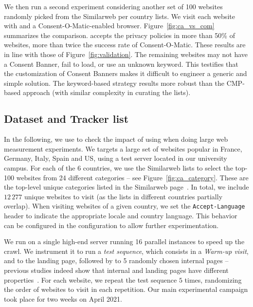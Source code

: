 We then run a second experiment considering another set of 100 websites randomly picked from the Similarweb per country lists. We visit each website with \TOOL and a Consent-O-Matic-enabled browser. Figure~\ref{fig:ca_vs_com} summarizes the comparison. \TOOL accepts the privacy policies in more than 50\% of websites, more than twice the success rate of Consent-O-Matic. These results are in line with those of Figure~\ref{fig:validation}. The remaining websites may not have a Consent Banner, fail to load, or use an unknown keyword. This testifies that the customization of Consent Banners makes it difficult to engineer a generic and simple solution. The keyword-based strategy results more robust than the CMP-based approach (with similar complexity in curating the lists).



\subsection{Dataset and Tracker list}
\label{sec:dataset}

In the following, we use \TOOL to check the impact of using \TOOL when doing large web measurement experiments. We targets a large set of websites popular in France, Germany, Italy, Spain and US, using a test server located in our university campus. For each of the $6$ countries, we use the Similarweb lists to select the top-100 websites from 24 different categories -- see Figure~\ref{fig:ca_category}. These are the top-level unique categories listed in the Similarweb page~\cite{similarwebcategories}. In total, we include $12\,277$ unique websites to visit (as the lists in different countries partially overlap). When visiting websites of a given country, we set the \texttt{Accept-Language} header to indicate the appropriate locale and country language. This behavior can be configured in the \TOOL configuration to allow further experimentation.

We run \TOOL on a single high-end server running 16 parallel instances to speed up the crawl. We instrument it to run a \emph{test sequence}, which consists in a \emph{Warm-up visit}, \BEFORE and \AFTER to the landing page, followed by \INTERNAL to 5 randomly chosen internal pages -- previous studies indeed show that internal and landing pages have different properties~\cite{aqeel2020on}. For each website, we repeat the test sequence $5$ times, randomizing the order of websites to visit in each repetition.  Our main experimental campaign took place for two weeks on April 2021.

